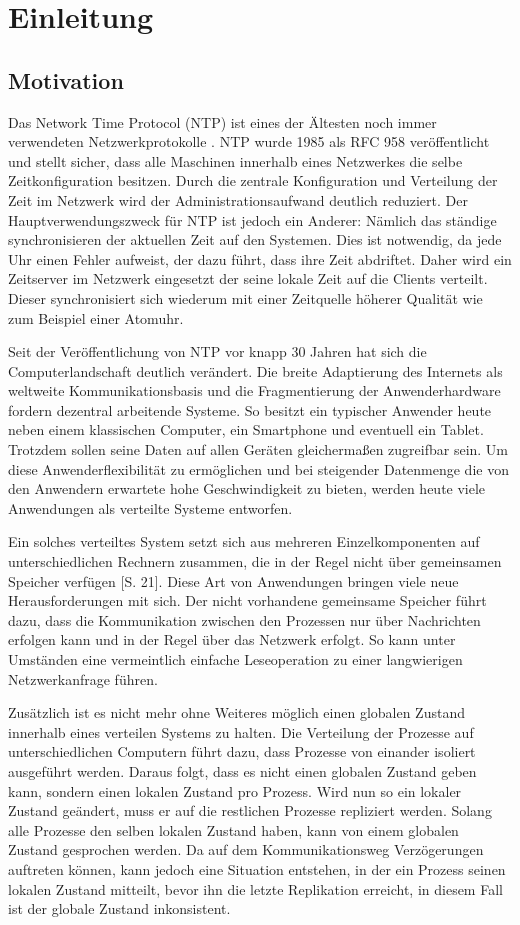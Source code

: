 \section{Einleitung}
\subsection{Motivation}
Das Network Time Protocol (NTP) ist eines der Ältesten noch immer verwendeten Netzwerkprotokolle \cite{cattini12}.
NTP wurde 1985 als RFC 958 veröffentlicht und stellt sicher, dass alle Maschinen innerhalb eines Netzwerkes die selbe Zeitkonfiguration besitzen.
Durch die zentrale Konfiguration und Verteilung der Zeit im Netzwerk wird der Administrationsaufwand deutlich reduziert.
Der Hauptverwendungszweck für NTP ist jedoch ein Anderer: Nämlich das ständige synchronisieren der aktuellen Zeit auf den Systemen.
Dies ist notwendig, da jede Uhr einen Fehler aufweist, der dazu führt, dass ihre Zeit abdriftet.
Daher wird ein Zeitserver im Netzwerk eingesetzt der seine lokale Zeit auf die Clients verteilt.
Dieser synchronisiert sich wiederum mit einer Zeitquelle höherer Qualität wie zum Beispiel einer Atomuhr.

Seit der Veröffentlichung von NTP vor knapp 30 Jahren hat sich die Computerlandschaft deutlich verändert.
Die breite Adaptierung des Internets als weltweite Kommunikationsbasis und die Fragmentierung der Anwenderhardware fordern dezentral arbeitende Systeme.
So besitzt ein typischer Anwender heute neben einem klassischen Computer, ein Smartphone und eventuell ein Tablet.
Trotzdem sollen seine Daten auf allen Geräten gleichermaßen zugreifbar sein.
Um diese Anwenderflexibilität zu ermöglichen und bei steigender Datenmenge die von den Anwendern erwartete hohe Geschwindigkeit zu bieten, werden heute viele Anwendungen als verteilte Systeme entworfen.

Ein solches verteiltes System setzt sich aus mehreren Einzelkomponenten auf unterschiedlichen Rechnern zusammen, die in der Regel nicht über gemeinsamen Speicher verfügen \cite{schill12}[S. 21].
Diese Art von Anwendungen bringen viele neue Herausforderungen mit sich.
Der nicht vorhandene gemeinsame Speicher führt dazu, dass die Kommunikation zwischen den Prozessen nur über Nachrichten erfolgen kann und in der Regel über das Netzwerk erfolgt. So kann unter Umständen eine vermeintlich einfache Leseoperation zu einer langwierigen Netzwerkanfrage führen.

Zusätzlich ist es nicht mehr ohne Weiteres möglich einen globalen Zustand innerhalb eines verteilen Systems zu halten.
Die Verteilung der Prozesse auf unterschiedlichen Computern führt dazu, dass Prozesse von einander isoliert ausgeführt werden.
Daraus folgt, dass es nicht einen globalen Zustand geben kann, sondern einen lokalen Zustand pro Prozess. Wird nun so ein lokaler Zustand geändert, muss er auf die restlichen Prozesse repliziert werden. Solang alle Prozesse den selben lokalen Zustand haben, kann von einem globalen Zustand gesprochen werden.
Da auf dem Kommunikationsweg Verzögerungen auftreten können, kann jedoch eine Situation entstehen, in der ein Prozess seinen lokalen Zustand mitteilt, bevor ihn die letzte Replikation erreicht, in diesem Fall ist der globale Zustand inkonsistent.

